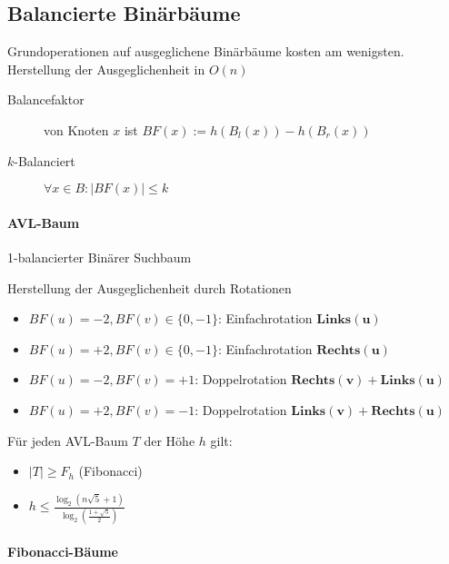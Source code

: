 \subsection{Balancierte Binärbäume}

Grundoperationen auf ausgeglichene Binärbäume kosten am wenigsten. Herstellung der Ausgeglichenheit in $O(n)$

\begin{description}
  \item [Balancefaktor] von Knoten $x$ ist $BF(x) := h(B_l (x)) - h(B_r (x))$

  \item[$k$-Balanciert] $\forall x \in B: |BF(x)| \leq k$
\end{description}

\paragraph{AVL-Baum} 1-balancierter Binärer Suchbaum

Herstellung der Ausgeglichenheit durch Rotationen


\begin{itemize}
  \item $BF(u) = -2, BF(v) \in \{ 0, -1 \}$: Einfachrotation $\mathbf{\text{Links}(u)}$
  \item $BF(u) = +2, BF(v) \in \{ 0, -1 \}$: Einfachrotation $\mathbf{\text{Rechts}(u)}$
  \item $BF(u) = -2, BF(v) = +1$: Doppelrotation $\mathbf{\text{Rechts}(v) + \text{Links}(u)}$
  \item $BF(u) = +2, BF(v) = -1$: Doppelrotation $\mathbf{\text{Links}(v) + \text{Rechts}(u)}$
\end{itemize}

Für jeden AVL-Baum $T$ der Höhe $h$ gilt:

\begin{itemize}
  \item $|T| \geq F_h$ (Fibonacci)
  \item $h \leq \frac{\log_2 (n\sqrt{5} + 1)}{\log_2 (\frac{1 + \sqrt{5}}{2})}$
\end{itemize}

\paragraph{Fibonacci-Bäume}

